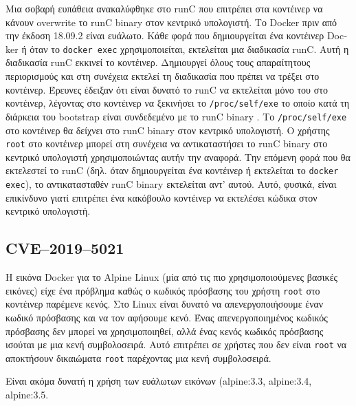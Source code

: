 Mια σοβαρή ευπάθεια ανακαλύφθηκε στο \textlatin{runC} που επιτρέπει στα
κοντέινερ να κάνουν \textlatin{overwrite} το \textlatin{runC binary} στον
κεντρικό υπολογιστή. Το \textlatin{Docker} πριν από την έκδοση 18.09.2 είναι
ευάλωτο. Κάθε φορά που δημιουργείται ένα κοντέινερ \textlatin{Docker} ή όταν το
\texttt{\textlatin{docker exec}} χρησιμοποιείται, εκτελείται μια διαδικασία
\textlatin{runC}. Αυτή η διαδικασία \textlatin{runC} εκκινεί το κοντέινερ.
Δημιουργεί όλους τους απαραίτητους περιορισμούς και στη συνέχεια εκτελεί τη
διαδικασία που πρέπει να τρέξει στο κοντέινερ. Έρευνες έδειξαν ότι είναι δυνατό
το \textlatin{runC} να εκτελείται μόνο του στο κοντέινερ, λέγοντας στο κοντέινερ
να ξεκινήσει το \texttt{\textlatin{/proc/self/exe}} το οποίο κατά τη διάρκεια του
\textlatin{bootstrap} είναι συνδεδεμένο με το \textlatin{runC binary}
\cite{CVE-2019-5736-DragonSector} \cite{CVE-2019-5736-Github}. Το
\texttt{\textlatin{/proc/self/exe}} στο κοντέινερ θα δείχνει στο \textlatin{runC
binary} στον κεντρικό υπολογιστή. Ο χρήστης \texttt{\textlatin{root}} στο
κοντέινερ μπορεί στη συνέχεια να αντικαταστήσει το \textlatin{runC binary} στο
κεντρικό υπολογιστή χρησιμοποιώντας αυτήν την αναφορά. Την επόμενη φορά που θα
εκτελεστεί το \textlatin{runC} (δηλ. όταν δημιουργείται ένα κοντέινερ ή
εκτελείται το \texttt{\textlatin{docker exec}}), το αντικατασταθέν
\textlatin{runC binary} εκτελείται αντ' αυτού. Αυτό, φυσικά, είναι επικίνδυνο
γιατί επιτρέπει ένα κακόβουλο κοντέινερ να εκτελέσει κώδικα στον κεντρικό
υπολογιστή.

\subsection{\textlatin{CVE–2019–5021}}

Η εικόνα \textlatin{Docker} για το \textlatin{Alpine Linux} (μία από τις πιο
χρησιμοποιούμενες βασικές εικόνες) είχε
ένα πρόβλημα καθώς ο κωδικός πρόσβασης του χρήστη \texttt{\textlatin{root}} στο
κοντέινερ παρέμενε κενός.
Στο \textlatin{Linux} είναι δυνατό να απενεργοποιήσουμε έναν κωδικό πρόσβασης και
να τον αφήσουμε κενό. Ένας απενεργοποιημένος κωδικός πρόσβασης δεν μπορεί να
χρησιμοποιηθεί, αλλά ένας κενός κωδικός πρόσβασης ισούται με μια κενή
συμβολοσειρά. Αυτό επιτρέπει σε χρήστες που δεν είναι \texttt{\textlatin{root}}
να αποκτήσουν δικαιώματα \texttt{\textlatin{root}} παρέχοντας μια κενή
συμβολοσειρά.

Είναι ακόμα δυνατή η χρήση των ευάλωτων εικόνων (\textlatin{alpine:3.3,
alpine:3.4, alpine:3.5}. \\


